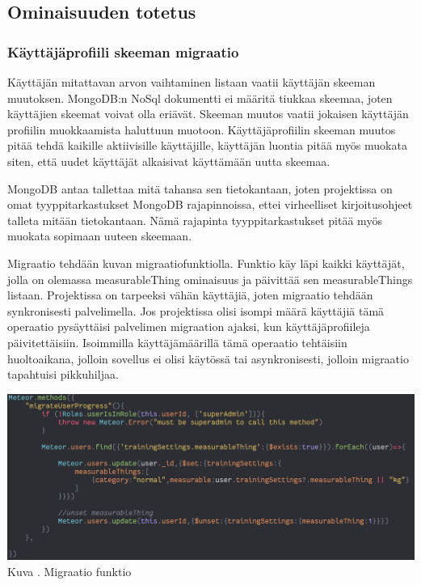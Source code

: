 \subsection{Ominaisuuden totetus}


\subsubsection{Käyttäjäprofiili skeeman migraatio}



Käyttäjän mitattavan arvon vaihtaminen listaan vaatii käyttäjän skeeman muutoksen.
MongoDB:n NoSql dokumentti ei määritä tiukkaa skeemaa, joten käyttäjien skeemat voivat olla eriävät.
Skeeman muutos vaatii jokaisen käyttäjän profiilin muokkaamista haluttuun muotoon.
Käyttäjäprofiilin skeeman muutos pitää tehdä kaikille aktiivisille käyttäjille, käyttäjän luontia pitää myös muokata siten, 
että uudet käyttäjät alkaisivat käyttämään uutta skeemaa.
\medskip

MongoDB antaa tallettaa mitä tahansa sen tietokantaan, joten projektissa on omat tyyppitarkastukset MongoDB rajapinnoissa, 
ettei virheelliset kirjoitusohjeet talleta mitään tietokantaan.
Nämä rajapinta tyyppitarkastukset pitää myös muokata sopimaan uuteen skeemaan.
\medskip

Migraatio tehdään kuvan \nextImageCount {} migraatiofunktiolla. 
Funktio käy läpi kaikki käyttäjät, jolla on olemassa measurableThing ominaisuus ja päivittää sen measurableThings listaan.
Projektissa on tarpeeksi vähän käyttäjiä, joten migraatio tehdään synkronisesti palvelimella. 
Jos projektissa olisi isompi määrä käyttäjiä tämä operaatio pysäyttäisi palvelimen migraation ajaksi, kun käyttäjäprofiileja päivitettäisiin.
Isoimmilla käyttäjämäärillä tämä operaatio tehtäisiin huoltoaikana, jolloin sovellus ei olisi käytössä tai asynkronisesti, 
jolloin migraatio tapahtuisi pikkuhiljaa. 
\medskip

\bigskip
\includegraphics[width =15cm]{src/public/oppar/migrationfunction.png}\\
Kuva \getImgCount{}. Migraatio funktio
\medskip







